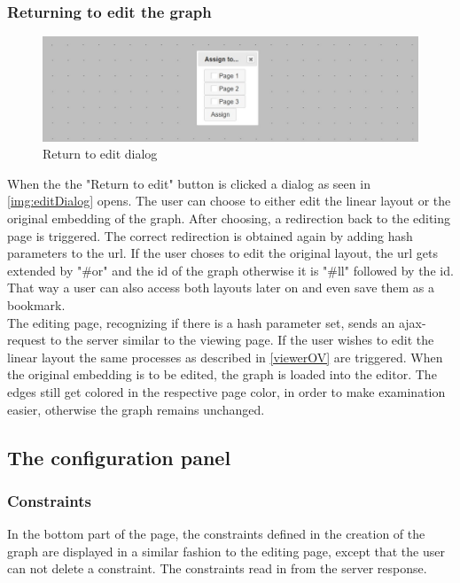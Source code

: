 \subsubsection{Returning to edit the graph}
\label{BtoEdit}
\begin{figure}[!h]
\begin{center}
\includegraphics[width=1\textwidth]{figures/figSecond/backtoEditing.jpg}
\caption{Return to edit dialog}
\label{img:editDialog}
\end{center}
\end{figure}
When the the "Return to edit" button is clicked a dialog as seen in \autoref{img:editDialog} opens. The user can choose to either edit the linear layout or the original embedding of the graph. After choosing, a redirection back to the editing page is triggered.
The correct redirection is obtained again by adding hash parameters to the url. If the user choses to edit the original layout, the url gets extended by "\#or" and the id of the graph otherwise it is "\#ll" followed by the id. That way a user can also access both layouts later on and even save them as a bookmark.\\
The editing page, recognizing if there is a hash parameter set, sends an ajax-request to the server similar to the viewing page. If the user wishes to edit the linear layout the same processes as described in \autoref{viewerOV} are triggered. When the original embedding is to be edited, the graph is loaded into the editor. The edges still get colored in the respective page color, in order to make examination easier, otherwise the graph remains unchanged.\\
\subsection{The configuration panel}
\subsubsection{Constraints}
In the bottom part of the page, the constraints defined in the creation of the graph are displayed in a similar fashion to the editing page, except that the user can not delete a constraint. The constraints read in from the server response.
